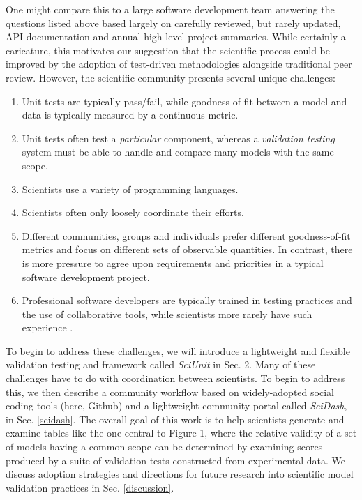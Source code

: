 \documentclass[9pt]{sig-alternate}
\begin{document}
One might compare this to a large software development team answering the questions listed above based largely on carefully reviewed, but rarely updated,  API documentation and annual high-level project summaries.
While certainly a caricature, this motivates our suggestion that the scientific process could be improved by the adoption of test-driven methodologies alongside traditional peer review. However, the scientific community presents several unique challenges:
\begin{enumerate}
\item Unit tests are typically pass/fail, while goodness-of-fit between a model and data is typically measured by a continuous metric. 
\item Unit tests often test a \emph{particular} component, whereas a \emph{validation testing} system must be able to handle and compare many models with the same scope. %
\item Scientists use a variety of programming languages.
\item Scientists often only loosely coordinate their efforts.
\item Different communities, groups and individuals prefer different goodness-of-fit metrics and focus on different sets of observable quantities. In contrast, there is more pressure to agree upon requirements and priorities in a typical software development project.
\item Professional software developers are typically trained in testing practices and the use of collaborative tools, while scientists more rarely have such experience \cite{oai:open.ac.uk.OAI2:17673}. %
\end{enumerate}

To begin to address these challenges, we will introduce a lightweight and flexible validation testing and framework called \textit{SciUnit} in Sec. 2. Many of these challenges have to do with coordination between scientists. To begin to address this, we then describe a community workflow based on widely-adopted social coding tools (here, Github) and a lightweight community portal called \textit{SciDash}, in Sec. \ref{scidash}. The overall goal of this work is to help scientists generate and examine tables like the one central to Figure 1, where the relative validity of a set of models having a common scope can be determined by examining scores produced by a suite of validation tests constructed from experimental data. 
We discuss adoption strategies and directions for future research into scientific model validation practices in Sec. \ref{discussion}.
\end{document}
